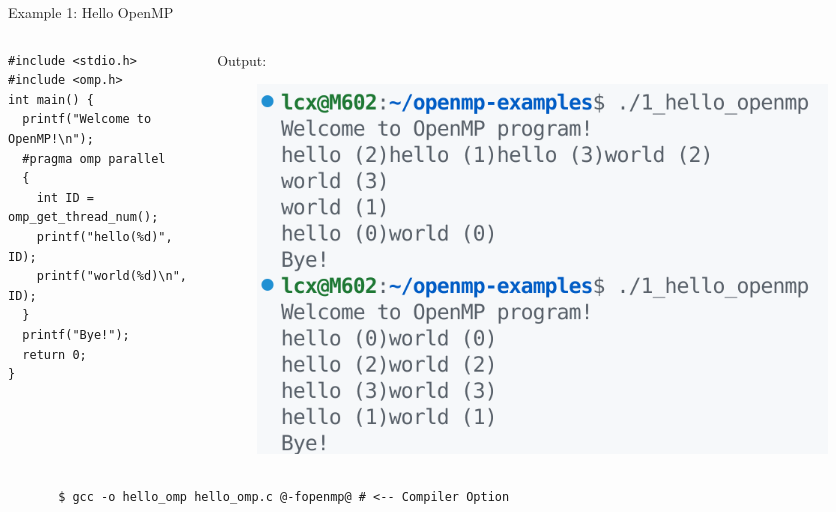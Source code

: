 \begin{frame}[fragile]{Example 1: Hello OpenMP}
  \begin{columns}[T] %
    \begin{column}{0.6\textwidth}
      \vspace{-10pt} %
      \begin{verbatim}
#include <stdio.h>
#include <omp.h>
int main() {
  printf("Welcome to OpenMP!\n");
  #pragma omp parallel
  {
    int ID = omp_get_thread_num();
    printf("hello(%d)", ID);
    printf("world(%d)\n", ID);
  }
  printf("Bye!");
  return 0;
}
      \end{verbatim}
    \end{column}
    \begin{column}{0.4\textwidth}
       Output:
      \vfill
      \begin{figure}
        \centering
        \includegraphics[width=1\linewidth]{day8_am/img/example-1-output.png}
      \end{figure}
    \end{column}
  \end{columns}

  \begin{verbatim}
       $ gcc -o hello_omp hello_omp.c @-fopenmp@ # <-- Compiler Option
   \end{verbatim}
\end{frame}


